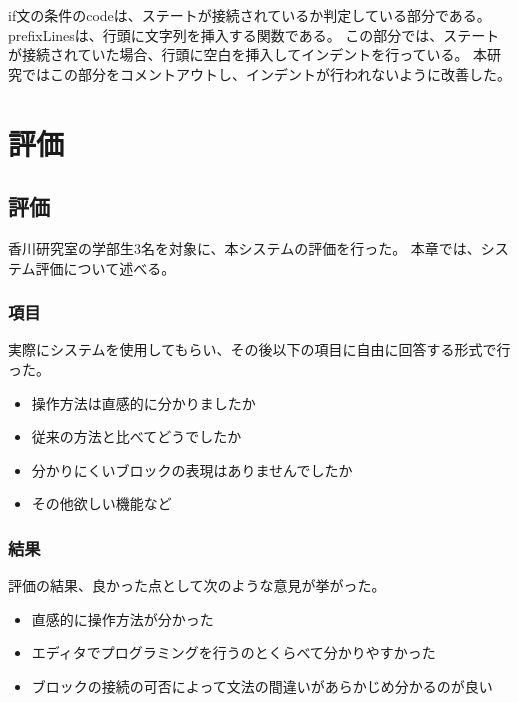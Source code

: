 \documentclass{risepaper}
\begin{document}

if文の条件のcodeは、ステートが接続されているか判定している部分である。
prefixLinesは、行頭に文字列を挿入する関数である。
この部分では、ステートが接続されていた場合、行頭に空白を挿入してインデントを行っている。
本研究ではこの部分をコメントアウトし、インデントが行われないように改善した。


\chapter{評価}
\section{評価}

香川研究室の学部生3名を対象に、本システムの評価を行った。
本章では、システム評価について述べる。

\subsection{項目}

実際にシステムを使用してもらい、その後以下の項目に自由に回答する形式で行った。
\begin{itemize}
\item 操作方法は直感的に分かりましたか
\item 従来の方法と比べてどうでしたか
\item 分かりにくいブロックの表現はありませんでしたか
\item その他欲しい機能など
\end{itemize}

\subsection{結果}

評価の結果、良かった点として次のような意見が挙がった。
\begin{itemize}
\item 直感的に操作方法が分かった
\item エディタでプログラミングを行うのとくらべて分かりやすかった
\item ブロックの接続の可否によって文法の間違いがあらかじめ分かるのが良い
\end{itemize}
\end{document}
